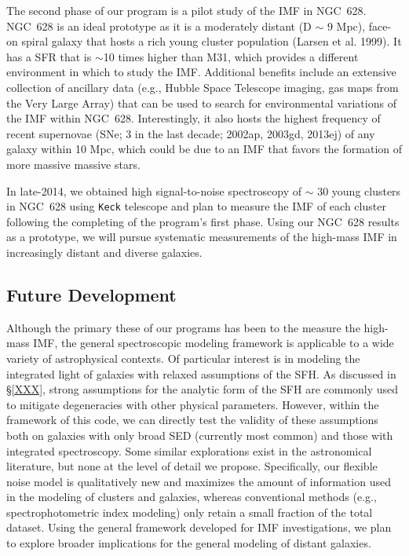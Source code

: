 \documentclass[11pt,preprint]{aastex}
\begin{document}
The second phase of our program is a pilot study of the IMF in NGC~628.  NGC~628 is an ideal prototype as it is a moderately distant (D $\sim$ 9 Mpc), face-on spiral galaxy that hosts a rich young cluster population (Larsen et al. 1999).  It has a SFR that is $\sim$10 times higher than M31, which provides a different environment in which to study the IMF.  Additional benefits include an extensive collection of ancillary data (e.g., Hubble Space Telescope imaging, gas maps from the Very Large Array) that can be used to search for environmental variations of the IMF within NGC~628. Interestingly, it also hosts the highest frequency of recent supernovae (SNe; 3 in the last decade;  2002ap, 2003gd, 2013ej) of any galaxy within 10 Mpc, which could be due to an IMF that favors the formation of more massive massive stars. 

In late-2014, we obtained high signal-to-noise spectroscopy of $\sim$ 30 young clusters in NGC~628 using \texttt{Keck} telescope and plan to measure the IMF of each cluster following the completing of the program's first phase.  Using our NGC~628 results as a prototype, we will pursue systematic measurements of the high-mass IMF in increasingly distant and diverse galaxies.

\subsection{Future Development}

Although the primary these of our programs has been to the measure the high-mass IMF, the general spectroscopic modeling framework is applicable to a wide variety of astrophysical contexts.  Of particular interest is in modeling the integrated light of galaxies with relaxed assumptions of the SFH.  As discussed in \S \ref{XXX}, strong assumptions for the analytic form of the SFH are commonly used to mitigate degeneracies with other physical parameters.  However, within the framework of this code, we can directly test the validity of these assumptions both on galaxies with only broad SED (currently most common) and those with integrated spectroscopy.  Some similar explorations exist in the astronomical literature, but none at the level of detail we propose.  Specifically, our flexible noise model is qualitatively new and maximizes the amount of information used in the modeling of clusters and galaxies, whereas conventional methods (e.g., spectrophotometric index modeling) only retain a small fraction of the total dataset.  Using the general framework developed for IMF investigations, we plan to explore broader implications for the general modeling of distant galaxies.
\end{document}
